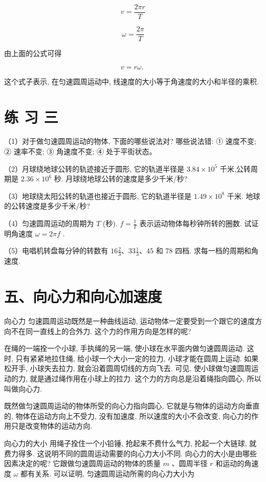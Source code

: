 \documentclass[10pt]{article}
\begin{document}
\[
v = \frac{2\pi r}{T}
\]

\[
\omega = \frac{2\pi }{T}
\]

由上面的公式可得

\[
v = {r\omega }\text{. }
\]

这个式子表示, 在匀速圆周运动中, 线速度的大小等于角速度的大小和半径的乘积.

\section*{练 习 三}

（1）对于做匀速圆周运动的物体, 下面的哪些说法对? 哪些说法错: ① 速度不变; ② 速率不变; ③ 角速度不变; ④ 处于平街状态。

（2）月球绕地球公转的轨迹接近于圆形, 它的轨道半径是 \({3.84} \times {10}^{5}\) 千米,公转周期是 \({2.36} \times {10}^{6}\) 秒. 月球绕地球公转的速度是多少千米/秒?

（3）地球绕太阳公转的轨道也接近于圆形, 它的轨道半径是 \({1.49} \times {10}^{8}\) 千米. 地球的公转速度是多少千米/秒?

（4）匀速圆周运动的周期为 \(T\) (秒). \(f = \frac{1}{T}\) 表示运动物体每秒钟所转的圈数. 试证明角速度 \(\omega = {2\pi f}\) .

（5）电唱机转盘每分钟的转数有 \({16}\frac{2}{3}\text{、}{33}\frac{1}{3}\text{、}{45}\) 和 78 四档. 求每一档的周期和角速度.

\section*{五、向心力和向心加速度}

向心力 匀速圆周运动既然是一种曲线运动, 运动物体一定要受到一个跟它的速度方向不在同一直线上的合外力. 这个力的作用方向是怎样的呢?

在绳的一端拴一个小球, 手执绳的另一端, 使小球在水平面内做匀速圆周运动. 这时, 只有紧紧地拉住绳, 给小球一个大小一定的拉力, 小球才能在圆周上运动. 如果松开手, 小球失去拉力, 就会沿着圆周切线的方向飞去. 可见, 使小球做匀速圆周运动的力, 就是通过绳作用在小球上的拉力. 这个力的方向总是沿着绳指向圆心, 所以叫做向心力.

既然做匀速圆周运动的物体所受的向心力指向圆心, 它就是与物体的运动方向垂直的, 物体在运动方向上不受力, 没有加速度, 所以速度的大小不会改变, 向心力的作用只是改变物体的运动方向.

向心力的大小 用绳子拴住一个小铅锤, 抢起来不费什么气力, 抡起一个大链球, 就费力得多. 这说明不同的圆周运动需要的向心力大小不同. 向心力的大小是由哪些因素决定的呢? 它跟做匀速圆周运动的物体的质量 \(m\) 、圆周半径 \(r\) 和运动的角速度 \(\omega\) 都有关系. 可以证明, 匀速圆周运动所需的向心力大小为
\end{document}
